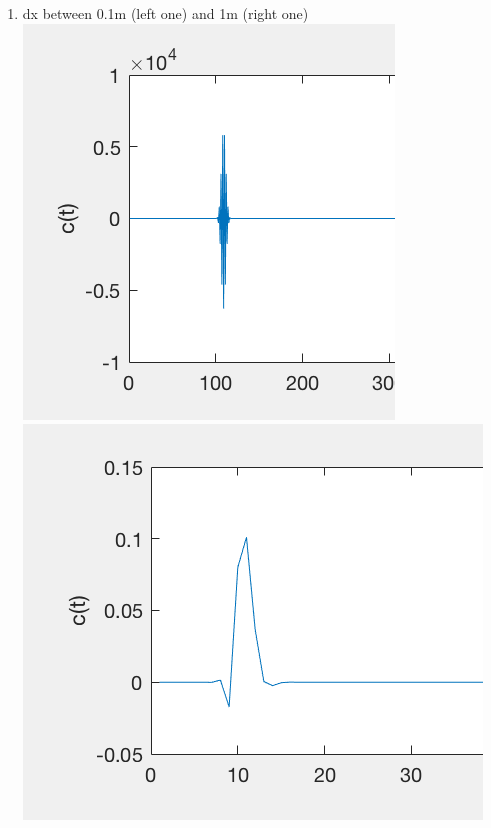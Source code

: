\documentclass[onecolumn]{article}
\begin{document}
\begin{enumerate}
	\item dx between 0.1m (left one) and 1m (right one) \\
    \includegraphics[scale=1]{dx01}
	\includegraphics[scale=1]{dx1}
    

\end{enumerate}
\end{document}
